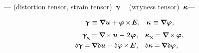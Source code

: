 \vspace{-0.1em} \:---
 (distortion tensor, strain tensor)~$\bm{\upgamma}$
~ (wryness tensor)~$\bm{\kappa}\hspace{-0.1ex}$\:--- 

\nopagebreak\vspace{-0.1em}
\begin{equation}\label{deformationtensors:micropolarcontinuum}
\begin{array}{rl}
\distortiontensor \hspace{.16ex} \equiv \boldnabla \fieldofdisplacements \hspace{.1ex} + \fieldofrotations \hspace{-0.12ex} \times \hspace{-0.2ex} \bm{E} , &
\wrynesstensor \hspace{.16ex} \equiv \boldnabla \fieldofrotations \hspace{.1ex} ,
\end{array}
\end{equation}
%
\nopagebreak\vspace{-0.85em}
\begin{equation*}
\begin{array}{rl}
\distortiontensor_{\hspace{-0.25ex}\Xcompanion} \hspace{-0.16ex}
= \boldnabla \hspace{-0.16ex} \times \hspace{-0.1ex} \fieldofdisplacements \hspace{.12ex} - \hspace{.12ex} 2 \hspace{.16ex} \fieldofrotations \hspace{.1ex}
, &
\wrynesstensor_{\hspace{.1ex}\Xcompanion} \hspace{-0.16ex}
= \boldnabla \hspace{-0.16ex} \times \hspace{-0.1ex} \fieldofrotations \hspace{.1ex} ,
\\[.3em]
%
\variation{\distortiontensor}
= \hspace{-0.16ex} \boldnabla \variation{\fieldofdisplacements} \hspace{.1ex}
+ \variation{\fieldofrotations} \hspace{-0.2ex} \times \hspace{-0.2ex} \bm{E} \hspace{.1ex}
, &
\variation{\wrynesstensor} = \hspace{-0.16ex} \boldnabla \variation{\fieldofrotations} \hspace{.1ex} ,
\end{array}
\end{equation*}

